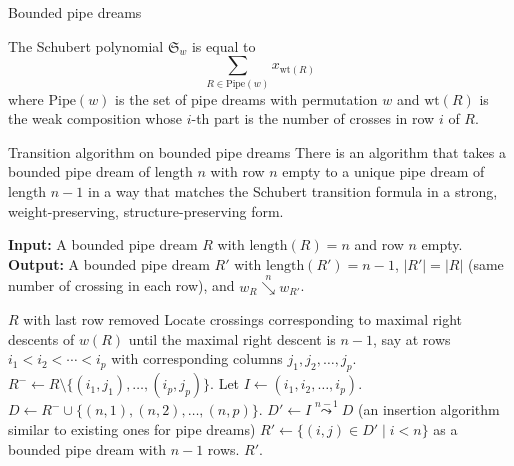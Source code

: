 \documentclass[aspectratio=169]{beamer}
\newcommand{\RC}{\mathrm{Pipe}}
\newcommand{\hr}{\mathrm{length}}
\newcommand{\downvar}[1]{\stackrel{#1}{\searrow}}
\newcommand{\wof}[1]{w_{#1}}
\newcommand{\xleadsto}[2][]{\overset{#2}{\leadsto}}
\newcommand{\ins}[2]{{#2\xleadsto{#1}}}
\begin{document}
\begin{frame}{Bounded pipe dreams}
\begin{theorem}
The Schubert polynomial $\mathfrak{S}_w$ is equal to
$$\sum_{R\in\RC(w)}x_{\mathrm{wt}(R)}$$
where $\RC(w)$ is the set of pipe dreams with permutation $w$ and $\mathrm{wt}(R)$ is the weak composition whose $i$-th part is the number of crosses in row $i$ of $R$.
\end{theorem}


\end{frame}

\begin{frame}{Transition algorithm on bounded pipe dreams}
  There is an algorithm that takes a bounded pipe dream of length $n$ with row $n$ empty to a unique pipe dream of length $n-1$
in a way that matches the Schubert transition formula in a strong, weight-preserving, structure-preserving form.
\begin{center}
  {\scriptsize
  \begin{algorithmic}
		\State \textbf{Input:} A bounded pipe dream $R$ with $\hr(R)=n$ and row $n$ empty.
		\State \textbf{Output:} A bounded  pipe dream $R'$ with $\hr(R')=n-1$, $|R'|=|R|$ (same number of crossing in each row), and $\wof{R}\downvar{n} \wof{R'}$.
		
		\State \Return $R$ with last row removed
		\Else
		\State Locate crossings corresponding to maximal right descents of $w(R)$ until the maximal right descent is $n-1$, say at rows $i_1 < i_2 < \cdots < i_p$ with corresponding columns $j_1, j_2, \ldots, j_p$.
		\State $R^- \gets R \setminus \{(i_1, j_1), \ldots, (i_p, j_p)\}$.
		\State Let $I \gets (i_1, i_2, \ldots, i_p)$.
		\State $D \gets R^- \cup \{(n, 1), (n, 2), \ldots, (n, p)\}$.
		\State $D' \gets \ins{n-1}{I} D$ (an insertion algorithm similar to existing ones for pipe dreams)
		\State $R' \gets \{(i, j) \in D' \mid i < n\}$ as a bounded pipe dream with $n-1$ rows.
		\State \Return $R'$.
		\EndIf
	\end{algorithmic}
  }
\end{center}
\end{frame}
\end{document}
